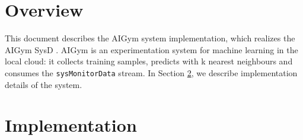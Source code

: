 \documentclass[a4paper]{arrowhead}
\begin{document}
\sloppy

\ArrowheadSetup

\begin{center}
  \vspace*{1cm}
  \huge{\arrowtitle}

  \vspace*{0.2cm}
  \LARGE{\arrowtype}
  \vspace*{1cm}

  \vspace*{\fill}


  \vspace*{1cm}
  \vspace*{\fill}

  \begin{abstract}
    This document describes the design and implementation of the AIGym support system of Arrowhead 5.2.2 (\texttt{ah5-AIGym-java-spring}).
  \end{abstract}

  \vspace*{1cm}
\end{center}

\newpage

\tableofcontents
\newpage

\section{Overview}
\label{sec:overview}

This document describes the AIGym system implementation, which realizes the AIGym SysD \cite{aig-sysd}. AIGym is an experimentation system for machine learning in the local cloud: it collects training samples, predicts with k nearest neighbours and consumes the \texttt{sysMonitorData} stream.
In Section \ref{Implementation}, we describe implementation details of the system.

\newpage

\section{Implementation}
\label{Implementation}
\end{document}
